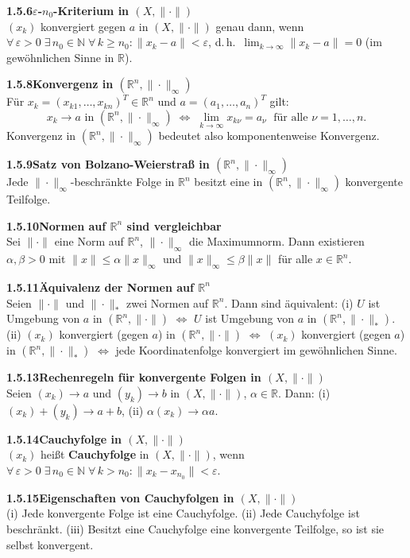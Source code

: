 \documentclass[a4paper,12pt]{article}
\newcommand{\gentry}[3]{%
  \noindent\textbf{#1\quad #2}\nopagebreak\\[0.2em]
  #3\par\smallskip
}
\begin{document}
\gentry{1.5.6}{$\varepsilon$-$n_0$-Kriterium in $(X, \|\cdot\|)$}{%
  $(x_k)$ konvergiert gegen $a$ in $(X, \|\cdot\|)$ genau dann, wenn
  $\forall\,\varepsilon > 0\;\exists\,n_0 \in \mathbb{N}\;\forall\,k \geq n_0: \|x_k - a\| < \varepsilon$,
  d.\,h.\ $\lim_{k \to \infty} \|x_k - a\| = 0$ (im gewöhnlichen Sinne in $\mathbb{R}$).
}

\gentry{1.5.8}{Konvergenz in $(\mathbb{R}^n, \|\cdot\|_\infty)$}{%
  Für $x_k = (x_{k1}, \ldots, x_{kn})^T \in \mathbb{R}^n$ und $a = (a_1, \ldots, a_n)^T$ gilt:
  \[
    x_k \to a \text{ in } (\mathbb{R}^n, \|\cdot\|_\infty) \;\Longleftrightarrow\;
    \lim_{k \to \infty} x_{k\nu} = a_\nu \;\text{ für alle } \nu = 1, \ldots, n.
  \]
  Konvergenz in $(\mathbb{R}^n, \|\cdot\|_\infty)$ bedeutet also komponentenweise Konvergenz.
}

\gentry{1.5.9}{Satz von Bolzano-Weierstraß in $(\mathbb{R}^n, \|\cdot\|_\infty)$}{%
  Jede $\|\cdot\|_\infty$-beschränkte Folge in $\mathbb{R}^n$ besitzt eine in
  $(\mathbb{R}^n, \|\cdot\|_\infty)$ konvergente Teilfolge.
}

\gentry{1.5.10}{Normen auf $\mathbb{R}^n$ sind vergleichbar}{%
  Sei $\|\cdot\|$ eine Norm auf $\mathbb{R}^n$, $\|\cdot\|_\infty$ die Maximumnorm. Dann
  existieren $\alpha, \beta > 0$ mit
  $\|x\| \leq \alpha \|x\|_\infty$ und $\|x\|_\infty \leq \beta \|x\|$ für alle $x \in \mathbb{R}^n$.
}

\gentry{1.5.11}{Äquivalenz der Normen auf $\mathbb{R}^n$}{%
  Seien $\|\cdot\|$ und $\|\cdot\|_*$ zwei Normen auf $\mathbb{R}^n$. Dann sind äquivalent:
  (i) $U$ ist Umgebung von $a$ in $({\mathbb{R}^n}, \|\cdot\|)$ $\Leftrightarrow$
  $U$ ist Umgebung von $a$ in $(\mathbb{R}^n, \|\cdot\|_*)$.
  (ii) $(x_k)$ konvergiert (gegen $a$) in $(\mathbb{R}^n, \|\cdot\|)$ $\Leftrightarrow$
  $(x_k)$ konvergiert (gegen $a$) in $(\mathbb{R}^n, \|\cdot\|_*)$ $\Leftrightarrow$
  jede Koordinatenfolge konvergiert im gewöhnlichen Sinne.
}

\gentry{1.5.13}{Rechenregeln für konvergente Folgen in $(X, \|\cdot\|)$}{%
  Seien $(x_k) \to a$ und $(y_k) \to b$ in $(X, \|\cdot\|)$, $\alpha \in \mathbb{R}$. Dann:
  (i) $(x_k) + (y_k) \to a + b$,
  (ii) $\alpha (x_k) \to \alpha a$.
}

\gentry{1.5.14}{Cauchyfolge in $(X, \|\cdot\|)$}{%
  $(x_k)$ heißt \textbf{Cauchyfolge} in $(X, \|\cdot\|)$, wenn
  $\forall\,\varepsilon > 0\;\exists\,n_0 \in \mathbb{N}\;\forall\,k > n_0: \|x_k - x_{n_0}\| < \varepsilon$.
}

\gentry{1.5.15}{Eigenschaften von Cauchyfolgen in $(X, \|\cdot\|)$}{%
  (i) Jede konvergente Folge ist eine Cauchyfolge.
  (ii) Jede Cauchyfolge ist beschränkt.
  (iii) Besitzt eine Cauchyfolge eine konvergente Teilfolge, so ist sie selbst konvergent.
}
\end{document}
